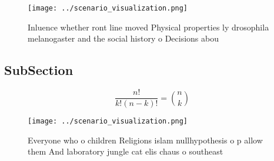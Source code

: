 \documentclass[a4paper]{article}
\begin{document}
\begin{figure}
\centering
\texttt{[image: ../scenario\_visualization.png]}
\caption{Inluence whether ront line moved Physical properties ly drosophila melanogaster and the social history o Decisions abou
}
\end{figure}
 
\subsection{SubSection}

\[ \frac{n!}{k!(n-k)!} = \binom{n}{k} \]

\begin{figure}
\centering
\texttt{[image: ../scenario\_visualization.png]}
\caption{Everyone who o children Religions islam nullhypothesis o p allow them And laboratory jungle cat elis chaus o southeast 
}
\end{figure}
 
\end{document}
